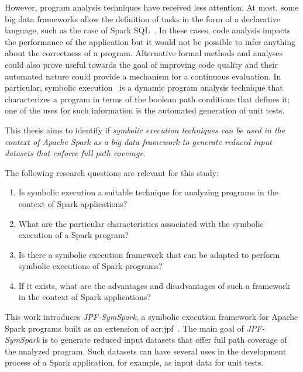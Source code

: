 However, program analysis techniques have received less attention. At most, some big data frameworks allow the definition of tasks in the form of a declarative language, such as the case of Spark SQL~\cite{Armbrust2015}. In these cases, code analysis impacts the performance of the application but it would not be possible to infer anything about the correctness of a program. Alternative formal methods and analyses could also prove useful towards the goal of improving code quality and their automated nature could provide a mechanism for a continuous evaluation. In particular, symbolic execution~\cite{Hoare1969,King1976} is a dynamic program analysis technique that characterizes a program in terms of the boolean path conditions that defines it; one of the uses for such information is the automated generation of unit tests. 

This thesis aims to identify if \textit{symbolic execution techniques can be used in the context of Apache Spark as a big data framework to generate reduced input datasets that enforce full path coverage}.

The following research questions are relevant for this study:

\begin{enumerate}
	\item Is symbolic execution a suitable technique for analyzing programs in the context of Spark applications?
	\item What are the particular characteristics associated with the symbolic execution of a Spark program?
	\item Is there a symbolic execution framework that can be adapted to perform symbolic executions of Spark programs?
	\item If it exists, what are the advantages and disadvantages of such a framework in the context of Spark applications?
\end{enumerate}

\label{sec:contributions}

This work introduces \textit{JPF-SymSpark}, a symbolic execution framework for Apache Spark programs built as an extension of \acrfull{acr:jpf}~\cite{Visser2003}. The main goal of \textit{JPF-SymSpark} is to generate reduced input datasets that offer full path coverage of the analyzed program. Such datasets can have several uses in the development process of a Spark application, for example, as input data for unit tests.

